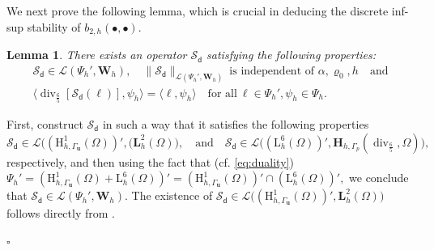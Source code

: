 \documentclass[11pt, reqno, a4paper, twoside]{article}
\newcommand{\bu}{\boldsymbol{u}}
\newcommand{\rH}{\mathrm{H}}
\newcommand{\rL}{\mathrm{L}}
\newcommand{\bH}{\mathbf{H}}
\newcommand{\bL}{\mathbf{L}}
\newcommand{\bW}{\mathbf{W}}
\newcommand{\cL}{\mathcal{L}}
\newcommand{\cS}{\mathcal{S}}
\newcommand\vdiv{\mathop{\mathrm{div}}\nolimits}
\newtheorem{lemma}[theorem]{Lemma}
\newenvironment{proof}{\noindent{\it Proof.}}{\hfill$\square$}
\numberwithin{equation}{section}
\numberwithin{remark}{section}
\numberwithin{figure}{section}
\numberwithin{table}{section}
\newcommand{\rrb}[1]{{\leavevmode\color{lightgreen}{#1}}}
\begin{document}
{{\noindent We next prove the following lemma, which is crucial in deducing the discrete inf-sup stability of \(b_{2,h}(\bullet,\bullet)\).
\begin{lemma}\label{lem:disc.inf-sup:ARD}
   There exists an operator \(\cS_{\mathsf{d}}\) satisfying the following properties:
    \begin{gather}\nonumber
    \cS_{\mathsf{d}} \in \cL(\Psi_h', \bW_h),\quad 
    \|\cS_{\mathsf{d}}\|_{\cL(\Psi_h', \bW_h)}\ \text{is independent of } \alpha,\varrho_0, h\quad \text{and}\\
    \langle{{\vdiv}_{\frac65}} [\cS_{\mathsf{d}}(\ell)], \psi_h\rangle = \langle \ell, \psi_h \rangle \quad \text{for all}\ \ell \in \Psi_h',\psi_h \in \Psi_h.\label{S:disc.prop}
\end{gather}
\end{lemma}
\begin{proof}
{First, construct \(\cS_{\mathsf{d}}\) in such a way that it satisfies the following properties 
\[\cS_{\mathsf{d}}\in\cL\bigl((\rH^1_{h,\Gamma_{\bu}}(\Omega))', (\bL_h^2(\Omega)\bigr),\quad \text{and} \quad  \cS_{\mathsf{d}}\in\cL\bigl((\rL_h^6(\Omega))', \bH_{h,\Gamma_p}(\vdiv_{\frac65},\Omega)\bigr),\]respectively, and then using the fact that (cf. \eqref{eq:duality}) \(\Psi_h'=(\rH^1_{h,\Gamma_{\bu}}(\Omega)+\rL_h^6(\Omega))'=(\rH^1_{h,\Gamma_{\bu}}(\Omega))'\cap(\rL_h^6(\Omega))',\) we conclude that \( \cS_{\mathsf{d}} \in {\cL}(\Psi_h', \bW_h) \).
The existence of \(\cS_{\mathsf{d}}\in\cL\bigl((\rH^1_{h,\Gamma_{\bu}}(\Omega))',\bL_h^2(\Omega)\bigr)\)
follows directly from \cite[Lemma~4.1]{dhpr_sinum26}.} 


\end{proof}}}
\end{document}
